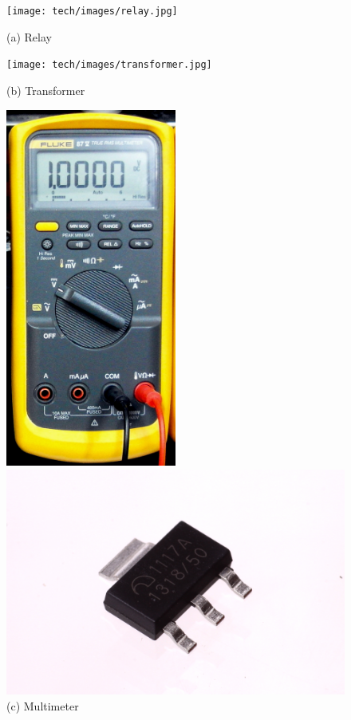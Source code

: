 \begin{figure}[h]
    \centering
    \begin{minipage}{0.24\textwidth}
        \texttt{[image: tech/images/relay.jpg]}
        \caption*{(a) Relay}
    \end{minipage}%
    \hfill%
    \begin{minipage}{0.24\textwidth}
        \texttt{[image: tech/images/transformer.jpg]}
        \caption*{(b) Transformer}
    \end{minipage}%
    \hfill%
    \begin{minipage}{0.24\textwidth}
        \centering
        \includegraphics[width=0.5\textwidth]{tech/images/multimeter.jpg}
        \caption*{(c) Multimeter}
    \end{minipage}%
    \hfill%
    \begin{minipage}{0.24\textwidth}
        \includegraphics[width=\textwidth]{tech/images/regulator.jpg}

\end{minipage}
\end{figure}

